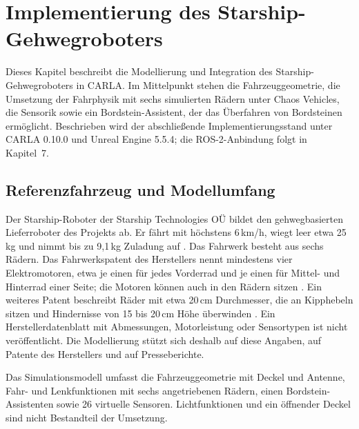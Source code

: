 \chapter{Implementierung des Starship-Gehwegroboters}
\label{chap:starship}

Dieses Kapitel beschreibt die Modellierung und Integration des Starship-Gehwegroboters
in CARLA. Im Mittelpunkt stehen die Fahrzeuggeometrie, die Umsetzung der Fahrphysik mit
sechs simulierten Rädern unter Chaos Vehicles, die Sensorik sowie ein Bordstein-Assistent,
der das Überfahren von Bordsteinen ermöglicht. Beschrieben wird der abschließende
Implementierungsstand unter CARLA 0.10.0 und Unreal Engine 5.5.4; die ROS-2-Anbindung
folgt in Kapitel~7.

\section{Referenzfahrzeug und Modellumfang}
\label{sec:starship_referenz}

Der Starship-Roboter der Starship Technologies OÜ bildet den gehwegbasierten
Lieferroboter des Projekts ab. Er fährt mit höchstens 6\,km/h, wiegt leer etwa 25\,kg
und nimmt bis zu 9,1\,kg Zuladung auf \parencite{wikipedia_starship}. Das Fahrwerk besteht
aus sechs Rädern. Das Fahrwerkspatent des Herstellers nennt mindestens vier Elektromotoren,
etwa je einen für jedes Vorderrad und je einen für Mittel- und Hinterrad einer Seite; die
Motoren können auch in den Rädern sitzen \parencite{starship_patent_fahrwerk}. Ein weiteres Patent beschreibt Räder mit etwa
20\,cm Durchmesser, die an Kipphebeln sitzen und Hindernisse von 15 bis 20\,cm Höhe
überwinden \parencite{starship_patent_bogie}. Ein Herstellerdatenblatt mit Abmessungen,
Motorleistung oder Sensortypen ist nicht veröffentlicht. Die Modellierung stützt sich
deshalb auf diese Angaben, auf Patente des Herstellers und auf Presseberichte.

Das Simulationsmodell umfasst die Fahrzeuggeometrie mit Deckel und Antenne,
Fahr- und Lenkfunktionen mit sechs angetriebenen Rädern, einen Bordstein-Assistenten
sowie 26 virtuelle Sensoren. Lichtfunktionen und ein öffnender Deckel sind nicht
Bestandteil der Umsetzung.

